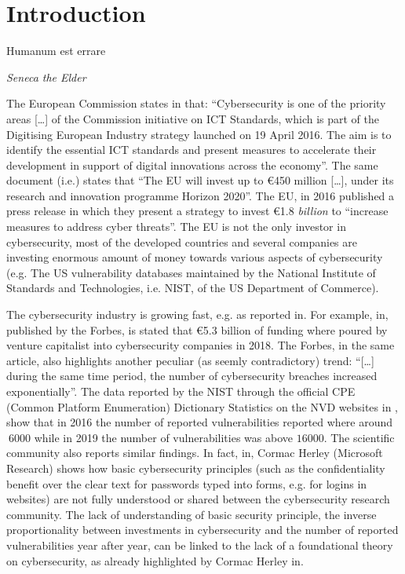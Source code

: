 \documentclass{article}
\theoremstyle{definition}
\theoremstyle{corollary}
\theoremstyle{lemma}
\theoremstyle{theorem}
\theoremstyle{theorem}
\begin{document}
\section{Introduction}\label{sec:intro}
\epigraph{Humanum est errare}{{\itshape Seneca the Elder}}
The European Commission states in\autocite{EU2019market} that: ``Cybersecurity
is one of the priority areas [\ldots] of the Commission initiative on ICT
Standards, which is part of the Digitising European
Industry\autocite{EU2019standard} strategy launched on 19 April 2016.  The aim
is to identify the essential ICT standards and present measures to accelerate
their development in support of digital innovations across the economy''. The
same document (i.e.\autocite{EU2019market}) states that ``The EU will invest up
to \euro450 million [\ldots], under its research and innovation programme
Horizon 2020''. The EU, in 2016 published a press release\autocite{EU2016press}
in which they present a strategy to invest \euro1.8 \emph{billion} to
``increase measures to address cyber threats''. The EU is not the only investor
in cybersecurity, most of the developed countries and several companies are
investing enormous amount of money towards various aspects of cybersecurity
(e.g. The US vulnerability databases\autocite{NIST2020NVD} maintained by the
National Institute of Standards and Technologies, i.e. NIST, of the US
Department of Commerce).

The cybersecurity industry is growing fast, e.g. as reported
in\autocite{Nasdaq2018market}. For example, in\autocite{Forbes2017market},
published by the Forbes, is stated that \euro5.3 billion of funding where
poured by venture capitalist into cybersecurity companies in 2018. The Forbes,
in the same article, also highlights another peculiar (as seemly contradictory)
trend: ``[\ldots] during the same time period, the number of cybersecurity
breaches increased exponentially''. The data reported by the NIST 
through the official CPE (Common Platform Enumeration) Dictionary Statistics 
on the NVD websites in \autocite{NIST2020CPEstatistics}, show that in 2016 the
number of reported vulnerabilities reported where around $~6000$ while in 2019
the number of vulnerabilities was above $16000$.  The scientific community also
reports similar findings.  In fact, in\autocite{Herley2009so}, Cormac Herley
(Microsoft Research) shows how basic cybersecurity principles (such as the
confidentiality benefit over the clear text for passwords typed into forms,
e.g. for logins in websites) are not fully understood or shared between the
cybersecurity research community\autocite{Nielsen2009stop}.  The lack of
understanding of basic security principle, the inverse proportionality between
investments in cybersecurity and the number of reported vulnerabilities year
after year, can be linked to the lack of a foundational theory on
cybersecurity, as already highlighted by Cormac Herley
in\autocite{Herley2016unfalsifiability}. 
\end{document}
